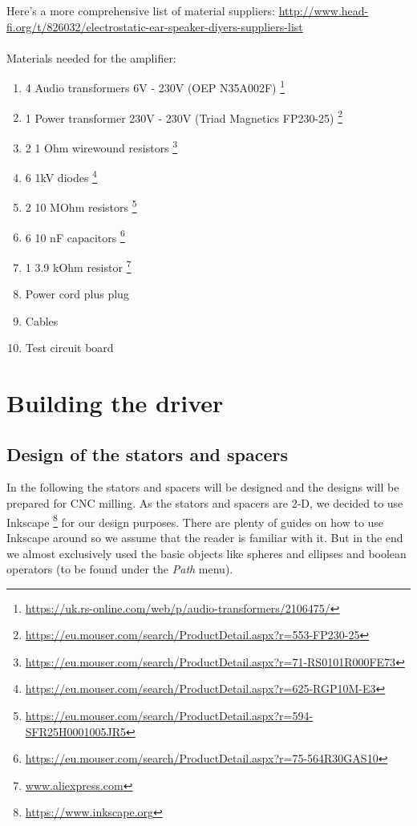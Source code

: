 \documentclass{article}
\begin{document}
Here's a more comprehensive list of material suppliers: \url{http://www.head-fi.org/t/826032/electrostatic-ear-speaker-diyers-suppliers-list}
\\
\\
Materials needed for the amplifier:
\begin{enumerate}
    \item 4 Audio transformers 6V - 230V (OEP N35A002F) \footnote{\url{https://uk.rs-online.com/web/p/audio-transformers/2106475/}}
    \item 1 Power transformer 230V - 230V (Triad Magnetics FP230-25) \footnote{\url{https://eu.mouser.com/search/ProductDetail.aspx?r=553-FP230-25}}
    \item 2 1 Ohm wirewound resistors \footnote{\url{https://eu.mouser.com/search/ProductDetail.aspx?r=71-RS0101R000FE73}}
    \item 6 1kV diodes \footnote{\url{https://eu.mouser.com/search/ProductDetail.aspx?r=625-RGP10M-E3}}
    \item 2 10 MOhm resistors \footnote{\url{https://eu.mouser.com/search/ProductDetail.aspx?r=594-SFR25H0001005JR5}}
    \item 6 10 nF capacitors \footnote{\url{https://eu.mouser.com/search/ProductDetail.aspx?r=75-564R30GAS10}}
    \item 1 3.9 kOhm resistor \footnote{\url{www.aliexpress.com}}
    \item Power cord plus plug
    \item Cables
    \item Test circuit board
\end{enumerate}

\section{Building the driver}
\label{s:driver}

\subsection{Design of the stators and spacers}
\label{s:driver:design}
In the following the stators and spacers will be designed and the designs will be prepared for CNC milling. As the stators and spacers are 2-D, we decided to use Inkscape \footnote{\url{https://www.inkscape.org}} for our design purposes. There are plenty of guides on how to use Inkscape around so we assume that the reader is familiar with it. But in the end we almost exclusively used the basic objects like spheres and ellipses and boolean operators (to be found under the \textit{Path} menu).
\end{document}
